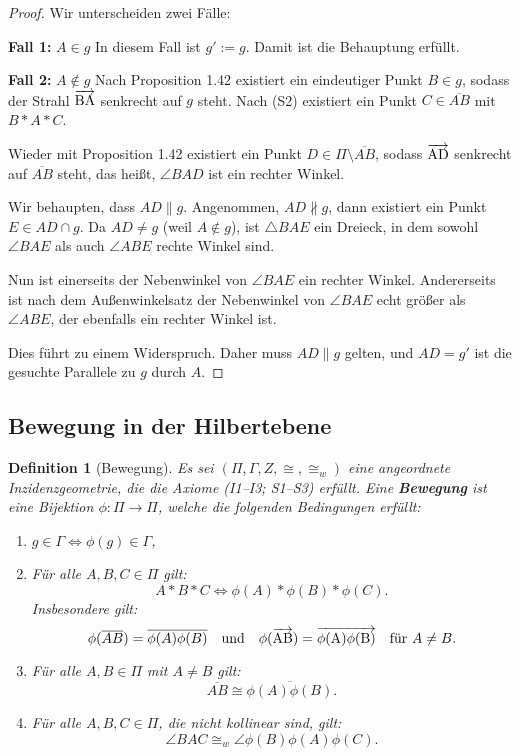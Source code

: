 \documentclass[a4paper,12pt]{article}
\theoremstyle{break}
\newtheorem{definition}{Definition}[section]
\begin{document}
\begin{proof}
Wir unterscheiden zwei Fälle:

\textbf{Fall 1:} \(A \in g\)  
In diesem Fall ist \(g' := g\). Damit ist die Behauptung erfüllt.

\textbf{Fall 2:} \(A \notin g\)  
Nach Proposition 1.42 existiert ein eindeutiger Punkt \(B \in g\), sodass der Strahl \(\overrightarrow{\rm BA}\) senkrecht auf \(g\) steht. Nach (S2) existiert ein Punkt \(C \in \overline{AB}\) mit \(B * A * C\).  

Wieder mit Proposition 1.42 existiert ein Punkt \(D \in \Pi \setminus \overline{AB}\), sodass \(\overrightarrow{\rm AD}\) senkrecht auf \(\overline{AB}\) steht, das heißt, \(\angle BAD\) ist ein rechter Winkel.  

Wir behaupten, dass \(AD \parallel g\). Angenommen, \(AD \not\parallel g\), dann existiert ein Punkt \(E \in AD \cap g\). Da \(AD \neq g\) (weil \(A \notin g\)), ist \(\triangle BAE\) ein Dreieck, in dem sowohl \(\angle BAE\) als auch \(\angle ABE\) rechte Winkel sind.  

Nun ist einerseits der Nebenwinkel von \(\angle BAE\) ein rechter Winkel. Andererseits ist nach dem Außenwinkelsatz der Nebenwinkel von \(\angle BAE\) echt größer als \(\angle ABE\), der ebenfalls ein rechter Winkel ist.  

Dies führt zu einem Widerspruch. Daher muss \(AD \parallel g\) gelten, und \(AD = g'\) ist die gesuchte Parallele zu \(g\) durch \(A\).
\end{proof}

\subsection{Bewegung in der Hilbertebene}

\begin{definition}[Bewegung]
Es sei \((\Pi, \Gamma, Z, \cong, \cong_w)\) eine angeordnete Inzidenzgeometrie, die die Axiome (I1--I3; S1--S3) erfüllt. Eine \textbf{Bewegung} ist eine Bijektion \(\phi: \Pi \to \Pi\), welche die folgenden Bedingungen erfüllt:
\begin{enumerate}
    \item \(g \in \Gamma \iff \phi(g) \in \Gamma\),
    \item Für alle \(A, B, C \in \Pi\) gilt:
    \[
    A * B * C \iff \phi(A) * \phi(B) * \phi(C).
    \]
    Insbesondere gilt:
    \[
    \phi(\overline{AB}) = \overline{\phi(A)\phi(B)} \quad \text{und} \quad \phi(\overrightarrow{\rm AB}) = \overrightarrow{\rm \phi(A)\phi(B)} \quad \text{für } A \neq B.
    \]
    \item Für alle \(A, B \in \Pi\) mit \(A \neq B\) gilt:
    \[
    \overline{AB} \cong \overline{\phi(A)\phi(B)}.
    \]
    \item Für alle \(A, B, C \in \Pi\), die nicht kollinear sind, gilt:
    \[
    \angle BAC \cong_w \angle \phi(B)\phi(A)\phi(C).
    \]
\end{enumerate}
\end{definition}
\end{document}
